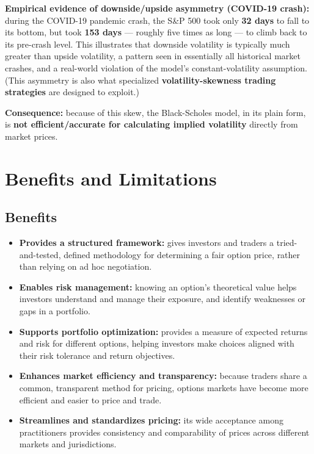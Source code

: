 \documentclass[12pt,openany]{book}
\theoremstyle{definition}
\theoremstyle{remark}
\begin{document}
\textbf{Empirical evidence of downside/upside asymmetry (COVID-19 crash):} during the COVID-19 pandemic crash, the S\&P 500 took only \textbf{32 days} to fall to its bottom, but took \textbf{153 days} --- roughly five times as long --- to climb back to its pre-crash level. This illustrates that downside volatility is typically much greater than upside volatility, a pattern seen in essentially all historical market crashes, and a real-world violation of the model's constant-volatility assumption. (This asymmetry is also what specialized \textbf{volatility-skewness trading strategies} are designed to exploit.)

\textbf{Consequence:} because of this skew, the Black-Scholes model, in its plain form, is \textbf{not efficient/accurate for calculating implied volatility} directly from market prices.

\section{Benefits and Limitations}

\subsection{Benefits}

\begin{itemize}
\item \textbf{Provides a structured framework:} gives investors and traders a tried-and-tested, defined methodology for determining a fair option price, rather than relying on ad hoc negotiation.


\item \textbf{Enables risk management:} knowing an option's theoretical value helps investors understand and manage their exposure, and identify weaknesses or gaps in a portfolio.


\item \textbf{Supports portfolio optimization:} provides a measure of expected returns and risk for different options, helping investors make choices aligned with their risk tolerance and return objectives.


\item \textbf{Enhances market efficiency and transparency:} because traders share a common, transparent method for pricing, options markets have become more efficient and easier to price and trade.


\item \textbf{Streamlines and standardizes pricing:} its wide acceptance among practitioners provides consistency and comparability of prices across different markets and jurisdictions.


\end{itemize}
\end{document}
